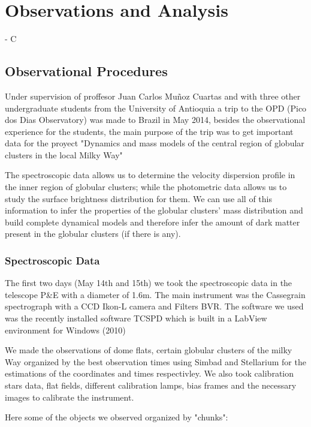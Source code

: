 \chapter{Observations and Analysis}

- C

\section{Observational Procedures}

Under supervision of proffesor Juan Carlos Mu\~noz Cuartas and with three other undergraduate students from the University of Antioquia a trip to the OPD (Pico dos Dias Observatory) was made to Brazil in May 2014, besides the observational experience for the students, the main purpose of the trip was to get important data for the proyect "Dynamics and mass models of the central region of globular clusters in the local Milky Way"

The spectroscopic data allows us to determine the velocity dispersion profile in the inner region of globular clusters; while the photometric data allows us to study the surface brightness distribution for them. We can use all of this information to infer the properties of the globular clusters' mass distribution and build complete dynamical models and therefore infer the amount of dark matter present in the globular clusters (if there is any).

\subsection{Spectroscopic Data}

The first two days (May 14th and 15th) we took the spectroscopic data in the telescope P\&E with a diameter of 1.6m. The main instrument was the Cassegrain spectrograph with a CCD Ikon-L camera and Filters BVR. The software we used was the recently installed software TCSPD which is built in a LabView environment for Windows (2010)

We made the observations of dome flats, certain globular clusters of the milky Way organized by the best observation times using Simbad and Stellarium for the estimations of the coordinates and times respectivley. We also took calibration stars data, flat fields, different calibration lamps, bias frames and the necessary images to calibrate the instrument.

Here some of the objects we observed organized by "chunks":

